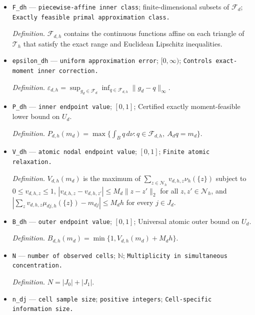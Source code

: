 \documentclass{article}
\begin{document}
\begin{itemize}
  \par\smallskip\noindent\emph{Definition.} \((E_{d,h}v_{d,h})(x)=\min\{1,\max\{0,\min_{z\in\mathcal N_h}[v_{d,h,z}+M_d\|x-z\|_2]\}\}\).
  \item \texttt{F\_\allowbreak{}dh} --- \texttt{piecewise-\allowbreak{}affine inner class}; finite-dimensional subsets of \(\mathcal F_d\); \texttt{Exactly feasible primal approximation class.}
  \par\smallskip\noindent\emph{Definition.} \(\mathcal F_{d,h}\) contains the continuous functions affine on each triangle of \(\mathcal T_h\) that satisfy the exact range and Euclidean Lipschitz inequalities.
  \item \texttt{epsilon\_\allowbreak{}dh} --- \texttt{uniform approximation error}; \([0,\infty)\); \texttt{Controls exact-\allowbreak{}moment inner correction.}
  \par\smallskip\noindent\emph{Definition.} \(\varepsilon_{d,h}=\sup_{g_d\in\mathcal F_d}\inf_{q\in\mathcal F_{d,h}}\|g_d-q\|_\infty\).
  \item \texttt{P\_\allowbreak{}dh} --- \texttt{inner endpoint value}; \([0,1]\); Certified exactly moment-feasible lower bound on \(U_d\).
  \par\smallskip\noindent\emph{Definition.} \(P_{d,h}(m_d)=\max\{\int_Bq\,d\nu:q\in\mathcal F_{d,h},\ A_dq=m_d\}\).
  \item \texttt{V\_\allowbreak{}dh} --- \texttt{atomic nodal endpoint value}; \([0,1]\); \texttt{Finite atomic relaxation.}
  \par\smallskip\noindent\emph{Definition.} \(V_{d,h}(m_d)\) is the maximum of \(\sum_{z\in\mathcal N_h}v_{d,h,z}\nu_h(\{z\})\) subject to \(0\le v_{d,h,z}\le1\), \(|v_{d,h,z}-v_{d,h,z'}|\le M_d\|z-z'\|_2\) for all \(z,z'\in\mathcal N_h\), and \(\left|\sum_zv_{d,h,z}\mu_{dj,h}(\{z\})-m_{dj}\right|\le M_dh\) for every \(j\in J_d\).
  \item \texttt{B\_\allowbreak{}dh} --- \texttt{outer endpoint value}; \([0,1]\); Universal atomic outer bound on \(U_d\).
  \par\smallskip\noindent\emph{Definition.} \(B_{d,h}(m_d)=\min\{1,V_{d,h}(m_d)+M_dh\}\).
  \item \texttt{N} --- \texttt{number of observed cells}; \(\mathbb N\); \texttt{Multiplicity in simultaneous concentration.}
  \par\smallskip\noindent\emph{Definition.} \(N=|J_0|+|J_1|\).
  \item \texttt{n\_\allowbreak{}dj} --- \texttt{cell sample size}; \texttt{positive integers}; \texttt{Cell-\allowbreak{}specific information size.}

\end{itemize}
\end{document}
